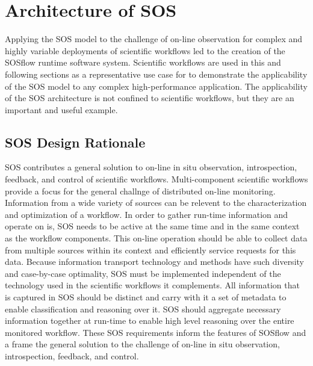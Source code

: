 
\section{Architecture of SOS}
Applying the SOS model to the challenge of on-line observation for
complex and highly variable deployments of scientific workflows led to
the creation of the SOSflow runtime software system.
%
Scientific workflows are used in this and following sections as a
representative use case for to demonstrate the applicability of the
SOS model to any complex high-performance application.
%
The applicability of the SOS architecture is not confined to
scientific workflows, but they are an important and useful example.


\subsection{SOS Design Rationale}
SOS contributes a general solution to on-line in situ
observation, introspection, feedback, and control of scientific
workflows.
%
Multi-component scientific workflows provide a focus for the
general challnge of distributed on-line monitoring.
%
Information from a wide variety of sources can be relevent to the
characterization and optimization of a workflow.
%
In order to gather run-time information and operate on is, SOS needs
to be active at the same time and in the same context as the workflow
components.
%
This on-line operation should be able to collect data from multiple
sources within its context and efficiently service requests
for this data.
%
Because information transport technology and methods have such
diversity and case-by-case optimality, SOS must be implemented
independent of the technology used in the scientific workflows it
complements.
%
All information that is captured in SOS should be distinct and carry
with it a set of metadata to enable classification and reasoning over
it.
%
SOS should aggregate necessary information together at run-time to
enable high level reasoning over the entire monitored workflow.
%
These SOS requirements inform the features of SOSflow and a frame the
general solution to the challenge of on-line in situ observation,
introspection, feedback, and control.

